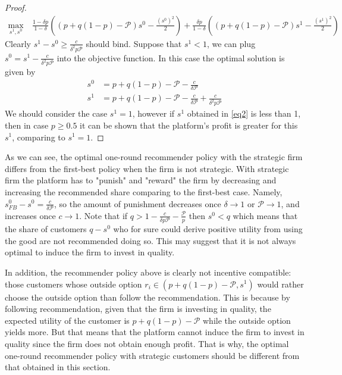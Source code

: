 \documentclass[a4paper]{article}
\begin{document}
\begin{proof}
	\begin{align*}
	\underset{s^1, s^0}{\max}&\ \frac{1-\delta p}{1-\delta}\left((p + q(1-p) - \mathcal{P})s^0 - \frac{(s^0)^2}{2}\right) + \frac{\delta p}{1-\delta}\left((p + q(1-p) - \mathcal{P})s^1 - \frac{(s^1)^2}{2}\right)
	\end{align*}
	Clearly $s^1 - s^0 \ge \frac{c}{\delta^2 p \mathcal{P}}$ should bind. Suppose that $s^1 < 1$, we can plug $s^0 = s^1 - \frac{c}{\delta^2 p \mathcal{P}}$ into the objective function. In this case the optimal solution is given by \begin{align}\label{eq2}
	s^0 &= p + q(1-p) - \mathcal{P} - \frac{c}{\delta \mathcal{P}} \nonumber\\
	s^1 &= p + q(1-p) - \mathcal{P} - \frac{c}{\delta \mathcal{P}} + \frac{c}{\delta^2 p \mathcal{P}}
	\end{align}
	We should consider the case $s^1 = 1$, however if $s^1$ obtained in \eqref{eq2} is less than 1, then in case $p \ge 0.5$ it can be shown that the platform's profit is greater for this $s^1$, comparing to $s^1 = 1$.
\end{proof}
As we can see, the optimal one-round recommender policy with the strategic firm differs from the first-best policy when the firm is not strategic. With strategic firm the platform has to "punish" and "reward" the firm by decreasing and increasing the recommended share comparing to the first-best case. Namely, $s^0_{FB} - s^0 = \frac{c}{\delta \mathcal{P}}$, so the amount of punishment decreases once $\delta \to 1$ or $\mathcal{P} \to 1$, and increases once $c \to 1$. Note that if $q > 1 - \frac{c}{\delta p \mathcal{P}} - \frac{\mathcal{P}}{p}$ then $s^0 < q$ which means that the share of customers $q - s^0$ who for sure could derive positive utility from using the good are not recommended doing so. This may suggest that it is not always optimal to induce the firm to invest in quality.



In addition, the recommender policy above is clearly not incentive compatible: those customers whose outside option $r_i \in \left(p+q(1-p) - \mathcal{P}, s^1 \right)$ would rather choose the outside option than follow the recommendation. This is because by following recommendation, given that the firm is investing in quality, the expected utility of the customer is $p + q(1-p) - \mathcal{P}$ while the outside option yields more. But that means that the platform cannot induce the firm to invest in quality since the firm does not obtain enough profit. That is why, the optimal one-round recommender policy with strategic customers should be different from that obtained in this section.
\end{document}
